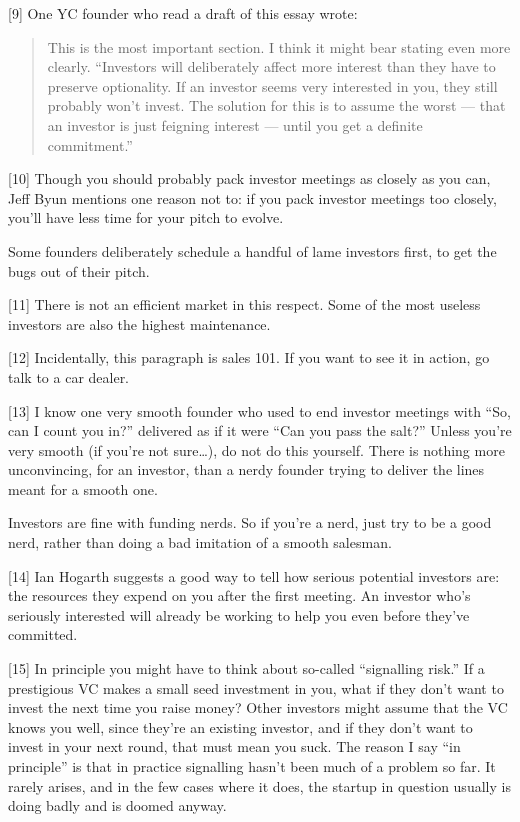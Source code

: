 {[}9{]} One YC founder who read a draft of this essay wrote:

\begin{quote}
This is the most important section. I think it might bear stating even
more clearly. ``Investors will deliberately affect more interest than
they have to preserve optionality. If an investor seems very interested
in you, they still probably won't invest. The solution for this is to
assume the worst --- that an investor is just feigning interest ---
until you get a definite commitment.''
\end{quote}

{[}10{]} Though you should probably pack investor meetings as closely as
you can, Jeff Byun mentions one reason not to: if you pack investor
meetings too closely, you'll have less time for your pitch to evolve.

Some founders deliberately schedule a handful of lame investors first,
to get the bugs out of their pitch.

{[}11{]} There is not an efficient market in this respect. Some of the
most useless investors are also the highest maintenance.

{[}12{]} Incidentally, this paragraph is sales 101. If you want to see
it in action, go talk to a car dealer.

{[}13{]} I know one very smooth founder who used to end investor
meetings with ``So, can I count you in?'' delivered as if it were ``Can
you pass the salt?'' Unless you're very smooth (if you're not
sure\ldots), do not do this yourself. There is nothing more
unconvincing, for an investor, than a nerdy founder trying to deliver
the lines meant for a smooth one.

Investors are fine with funding nerds. So if you're a nerd, just try to
be a good nerd, rather than doing a bad imitation of a smooth salesman.

{[}14{]} Ian Hogarth suggests a good way to tell how serious potential
investors are: the resources they expend on you after the first meeting.
An investor who's seriously interested will already be working to help
you even before they've committed.

{[}15{]} In principle you might have to think about so-called
``signalling risk.'' If a prestigious VC makes a small seed investment
in you, what if they don't want to invest the next time you raise money?
Other investors might assume that the VC knows you well, since they're
an existing investor, and if they don't want to invest in your next
round, that must mean you suck. The reason I say ``in principle'' is
that in practice signalling hasn't been much of a problem so far. It
rarely arises, and in the few cases where it does, the startup in
question usually is doing badly and is doomed anyway.

